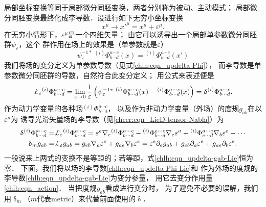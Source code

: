 局部坐标变换等同于局部微分同胚变换，两者分别称为被动、主动模式；
局部微分同胚变换最终化成李导数．设进行如下无穷小坐标变换
\begin{equation}
    x^\mu \to x'^\mu = x^\mu + \varepsilon^\mu .
\end{equation}
在无穷小情形下，$\varepsilon^\mu$是一个四维矢量；
由它可以诱导出一个局部单参数微分同胚群$\psi_\varepsilon$，这个
群作用在场上的效果是（单参数就是$\varepsilon$）
\begin{equation}
    \psi_\varepsilon^{-1*}\ {}^{(i)}\Phi^{a\cdots c}_{b\cdots d}(x)
    ={}^{(i)}\Phi^{a\cdots c}_{b\cdots d}(x')
\end{equation}
我们将场的变分定义为单参数导数（见式\eqref{chlh:eqn_updelta-Phi}），
而李导数是单参数微分同胚群的导数，自然符合此变分定义；
用公式来表述便是
\begin{equation*}
    \Lie_{\varepsilon} {}^{(i)}\Phi^{a\cdots c}_{b\cdots d}
    = \lim_{\varepsilon\to 0}\frac{1}{\varepsilon} \left(
    \psi_\varepsilon^{-1*}\ {}^{(i)}\Phi^{a\cdots c}_{b\cdots d}(x)
    -{}^{(i)}\Phi^{a\cdots c}_{b\cdots d}(x) \right)
    =\updelta {}^{(i)}\Phi^{a\cdots c}_{b\cdots d} .
\end{equation*}
作为动力学变量的各种场${}^{(i)}\Phi^{a\cdots c}_{b\cdots d}$，
以及作为非动力学变量（外场）的度规$g_{ab}$在以$\varepsilon^\mu$为
诱导光滑矢量场的李导数（见\eqref{chccr:eqn_LieD-tensor-Nabla}）为
\setlength{\mathindent}{0em}
\begin{align}
    \updelta {}^{(i)}\Phi^{a\cdots c}_{b\cdots d} =&
    \Lie_{\varepsilon} {}^{(i)}\Phi^{a\cdots c}_{b\cdots d} =
     \varepsilon^e\nabla_e {}^{(i)}\Phi^{a\cdots c}_{b\cdots d}
    - {}^{(i)}\Phi^{e\cdots c}_{b\cdots d} \nabla_e \varepsilon^a 
    + {}^{(i)}\Phi^{a\cdots c}_{e\cdots d} \nabla_b \varepsilon^e +\cdots
      \label{chlh:eqn_updelta-Phi-Lie} \\
    \updelta_{m} g_{ab} =&  
    \Lie_{\varepsilon} g_{ab} = g_{eb} \nabla_a \varepsilon^e
    + g_{ae} \nabla_b \varepsilon^e
    =\varepsilon^e\partial_e g_{ab}  + g_{eb} \partial_a \varepsilon^e
    + g_{ae} \partial_b \varepsilon^e . \label{chlh:eqn_updelta-gab-Lie}
\end{align}\setlength{\mathindent}{2em}
一般说来上两式的变换不是等距的；若等距，式\eqref{chlh:eqn_updelta-gab-Lie}恒为零．
下面，我们将以场的李导数\eqref{chlh:eqn_updelta-Phi-Lie}和
作为外场的度规的李导数\eqref{chlh:eqn_updelta-gab-Lie}为变分参量，
用它去变分作用量\eqref{chlh:eqn_action}．
当把度规$g_{ab}$看成进行变分时，
为了避免不必要的误解，我们用$\updelta_{m}$（$m$代表metric）来代替前面使用的$\updelta$．



